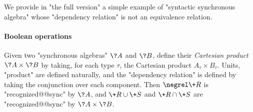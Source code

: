 We provide in "the full version"
a simple example of "syntactic synchronous algebra" whose "dependency relation"
is not an equivalence relation.  



\paragraph*{Boolean operations}
\AP Given two "synchronous algebras" $\?A$ and $\?B$, define their \emph{Cartesian product}
$\?A \times \?B$ by taking, for each type $\tau$, the Cartesian product $A_\tau \times B_\tau$. 
Units, "product" are defined naturally, and the "dependency relation" is defined
by taking the conjunction over each component.
Then $\negrel \+R$ is "recognized@@sync" by $\?A$, and
$\+R \cup \+S$ and $\+R \cap \+S$ are "recognized@@sync" by $\?A \times \?B$. 


